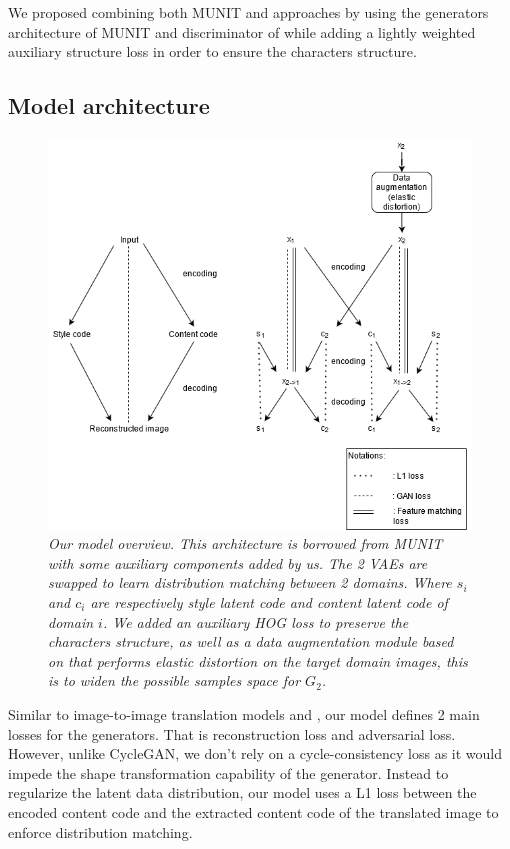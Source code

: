 \documentclass[12pt]{report}
\begin{document}
We proposed combining both MUNIT and \cite{ganimorph} approaches by using the generators architecture of MUNIT and discriminator of \cite{ganimorph} while adding a lightly weighted auxiliary structure loss in order to ensure the characters structure.

\subsection{Model architecture}

\begin{figure}[H]
	\centering
	\includegraphics[scale=0.7]{model-overview}
	\caption{\textit{Our model overview. This architecture is borrowed from MUNIT\cite{munit} with some auxiliary components added by us. The 2 VAEs are swapped to learn distribution matching between 2 domains. Where $s_i$ and $c_i$ are respectively style latent code and content latent code of domain $i$. We added an auxiliary HOG loss to preserve the characters structure, as well as a data augmentation module based on \cite{augmentor} that performs elastic distortion on the target domain images, this is to widen the possible samples space for $G_2$.}}
	\label{fig:model-overview}
\end{figure}

Similar to image-to-image translation models \cite{cycle-gan}\cite{bicycle-gan}\cite{disco-gan} and \cite{munit}, our model defines 2 main losses for the generators. That is reconstruction loss and adversarial loss. However, unlike CycleGAN, we don't rely on a cycle-consistency loss as it would impede the shape transformation capability of the generator. Instead to regularize the latent data distribution, our model uses a L1 loss between the encoded content code and the extracted content code of the translated image to enforce distribution matching. 
\end{document}
